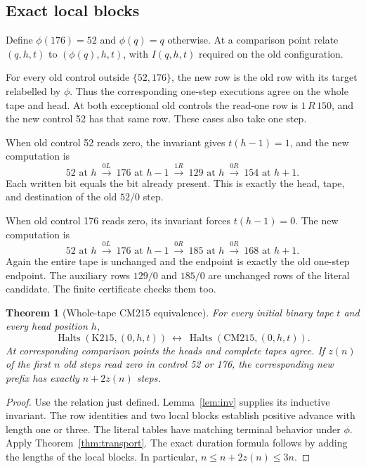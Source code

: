 \documentclass[11pt,letterpaper]{article}
\newtheorem{theorem}{Theorem}[section]
\theoremstyle{definition}
\newcommand{\Halts}{\operatorname{Halts}}
\newcommand{\K}{\mathrm{K215}}
\newcommand{\CM}{\mathrm{CM215}}
\begin{document}
\subsection{Exact local blocks}

Define $\phi(176)=52$ and $\phi(q)=q$ otherwise. At a comparison point
relate $(q,h,t)$ to $(\phi(q),h,t)$, with $I(q,h,t)$ required on the old
configuration.

For every old control outside $\{52,176\}$, the new row is the old row
with its target relabelled by $\phi$. Thus the corresponding one-step
executions agree on the whole tape and head. At both exceptional old
controls the read-one row is $1\,R\,150$, and the new control 52 has
that same row. These cases also take one step.

When old control 52 reads zero, the invariant gives $t(h-1)=1$, and the
new computation is
\[
 52\text{ at }h
 \ \xrightarrow{0L}\ 176\text{ at }h-1
 \ \xrightarrow{1R}\ 129\text{ at }h
 \ \xrightarrow{0R}\ 154\text{ at }h+1.
\]
Each written bit equals the bit already present. This is exactly the
head, tape, and destination of the old $52/0$ step.

When old control 176 reads zero, its invariant forces $t(h-1)=0$.
The new computation is
\[
 52\text{ at }h
 \ \xrightarrow{0L}\ 176\text{ at }h-1
 \ \xrightarrow{0R}\ 185\text{ at }h
 \ \xrightarrow{0R}\ 168\text{ at }h+1.
\]
Again the entire tape is unchanged and the endpoint is exactly the old
one-step endpoint. The auxiliary rows $129/0$ and $185/0$ are unchanged
rows of the literal candidate. The finite certificate checks them too.

\begin{theorem}[Whole-tape CM215 equivalence]\label{thm:cm}
For every initial binary tape $t$ and every head position $h$,
\[
 \Halts(\K,(0,h,t))\ \longleftrightarrow\
 \Halts(\CM,(0,h,t)).
\]
At corresponding comparison points the heads and complete tapes agree.
If $z(n)$ of the first $n$ old steps read zero in control 52 or 176, the
corresponding new prefix has exactly $n+2z(n)$ steps.
\end{theorem}

\begin{proof}
Use the relation just defined. Lemma~\ref{lem:inv} supplies its inductive
invariant. The row identities and two local blocks establish positive
advance with length one or three. The literal tables have matching
terminal behavior under $\phi$. Apply Theorem~\ref{thm:transport}.
The exact duration formula follows by adding the lengths of the local
blocks. In particular, $n\le n+2z(n)\le3n$.
\end{proof}
\end{document}
